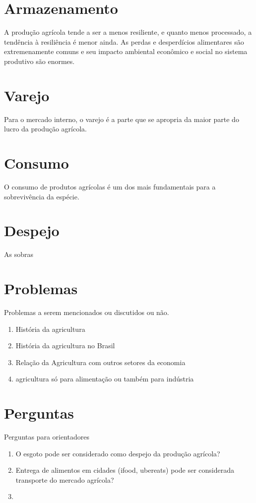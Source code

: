 \documentclass[]{article}
\begin{document}
\section{Armazenamento}

A produção agrícola tende a ser a menos resiliente, e quanto menos processado, a tendência à resiliência é menor ainda. As perdas e desperdícios alimentares são extremenamente comuns e seu impacto ambiental econômico e social no sistema produtivo são enormes. 

\section{Varejo}

Para o mercado interno, o varejo é a parte que se apropria da maior parte do lucro da produção agrícola.

\section{Consumo}

O consumo de produtos agrícolas é um dos mais fundamentais para a sobrevivência da espécie. 

\section{Despejo}

As sobras 


\section{Problemas}

Problemas a serem mencionados ou discutidos ou não.

\begin{enumerate}
	\item História da agricultura
	
	\item História da agricultura no Brasil
	
	\item Relação da Agricultura com outros setores da economia
	
	\item agricultura só para alimentação ou também para indústria
\end{enumerate}

\section{Perguntas}

Perguntas para orientadores

\begin{enumerate}
	\item O esgoto pode ser considerado como despejo da produção agrícola?
	
	\item Entrega de alimentos em cidades (ifood, ubereats) pode ser considerada transporte do mercado agrícola?
	
	\item 
	
\end{enumerate}
\end{document}
